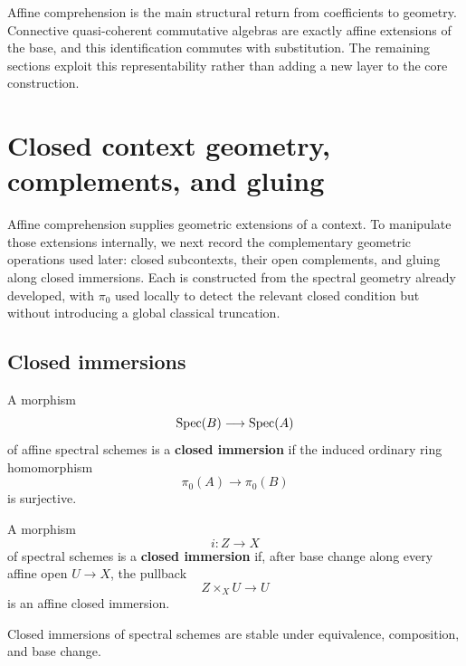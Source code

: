 Affine comprehension is the main structural return from coefficients to
geometry. Connective quasi-coherent commutative algebras are exactly affine
extensions of the base, and this identification commutes with substitution.
The remaining sections exploit this representability rather than adding a new
layer to the core construction.

\section{Closed context geometry, complements, and gluing}
\label{sec:closed-immersions-complements}

Affine comprehension supplies geometric extensions of a context. To manipulate
those extensions internally, we next record the complementary geometric
operations used later: closed subcontexts, their open complements, and gluing
along closed immersions. Each is constructed from the spectral geometry
already developed, with \(\pi_0\) used locally to detect the relevant closed
condition but without introducing a global classical truncation.

\subsection{Closed immersions}

\begin{definition}
\label{def:affine-closed-immersion-spectral}
A morphism
\[
    \operatorname{Spec}(B)
    \longrightarrow
    \operatorname{Spec}(A)
\]
of affine spectral schemes is a \textbf{closed immersion} if the induced
ordinary ring homomorphism
\[
    \pi_0(A)
    \longrightarrow
    \pi_0(B)
\]
is surjective.
\end{definition}

\begin{definition}
\label{def:closed-immersion-spectral-schemes}
A morphism
\[
    i
    \colon
    Z
    \longrightarrow
    X
\]
of spectral schemes is a \textbf{closed immersion} if, after base change
along every affine open $U\to X$, the pullback
\[
    Z\times_XU
    \longrightarrow
    U
\]
is an affine closed immersion.
\end{definition}

\begin{proposition}
\label{prop:closed-immersion-permanence}
Closed immersions of spectral schemes are stable under equivalence,
composition, and base change.
\end{proposition}

